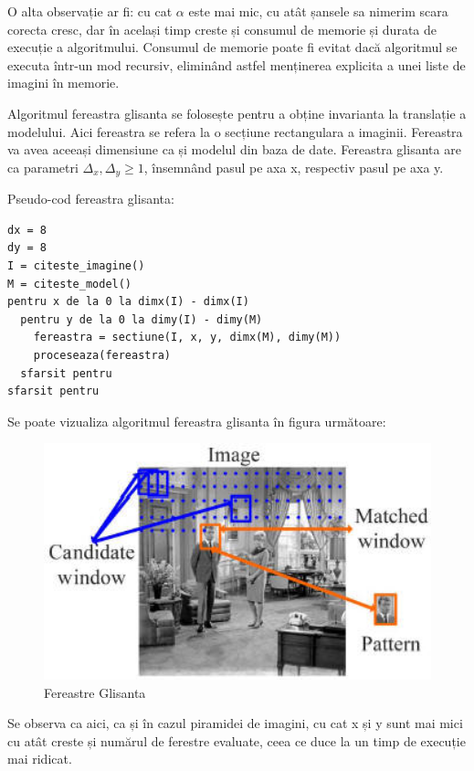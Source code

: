 O alta observație ar fi: cu cat ${\alpha}$ este mai mic, cu atât șansele sa nimerim scara corecta cresc, dar în același timp creste și consumul de memorie și durata de execuție a algoritmului.
Consumul de memorie poate fi evitat dacă algoritmul se executa într-un mod recursiv, eliminând astfel menținerea explicita a unei liste de imagini în memorie.

Algoritmul fereastra glisanta se folosește pentru a obține invarianta la translație a modelului.
Aici fereastra se refera la o secțiune rectangulara a imaginii.
Fereastra va avea aceeași dimensiune ca și modelul din baza de date.
Fereastra glisanta are ca parametri ${\Delta_x, \Delta_y \geq 1}$, însemnând pasul pe axa x, respectiv pasul pe axa y.

Pseudo-cod fereastra glisanta:
\begin{mdframed}
\begin{verbatim}
dx = 8
dy = 8
I = citeste_imagine()
M = citeste_model()
pentru x de la 0 la dimx(I) - dimx(I)
  pentru y de la 0 la dimy(I) - dimy(M)
    fereastra = sectiune(I, x, y, dimx(M), dimy(M))
    proceseaza(fereastra)
  sfarsit pentru
sfarsit pentru
\end{verbatim}
\end{mdframed}

Se poate vizualiza algoritmul fereastra glisanta în figura următoare:
\begin{figure}[H]
	\centering
		\includegraphics[width=1.00\textwidth]{imagini/sliding_window.png}
	\caption{Fereastre Glisanta \footnotemark}
	\label{fig:sliding_window}
\end{figure}


Se observa ca aici, ca și în cazul piramidei de imagini, cu cat x și y sunt mai mici cu atât creste și numărul de ferestre evaluate, ceea ce duce la un timp de execuție mai ridicat.

